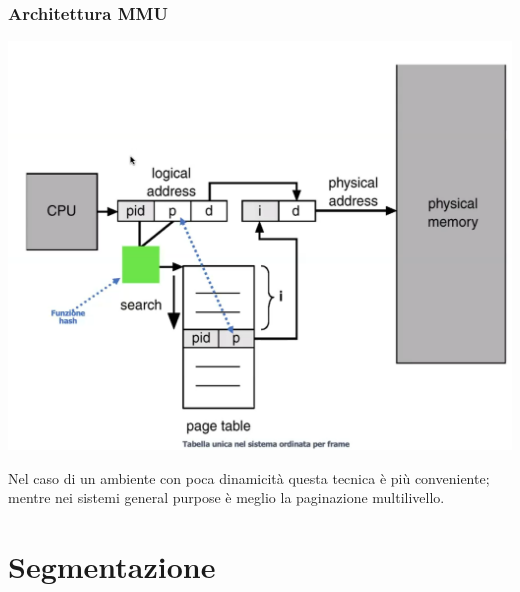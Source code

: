 \documentclass[a4paper,12pt, twoside]{report}
\begin{document}
\subsubsection{Architettura MMU}
\begin{center}
\includegraphics[scale=0.2]{hash_MMU}
\end{center}
Nel caso di un ambiente con poca dinamicit\`a questa tecnica \`e pi\`u conveniente; mentre nei sistemi 
general purpose \`e meglio la paginazione multilivello.

\section{Segmentazione}
\end{document}
